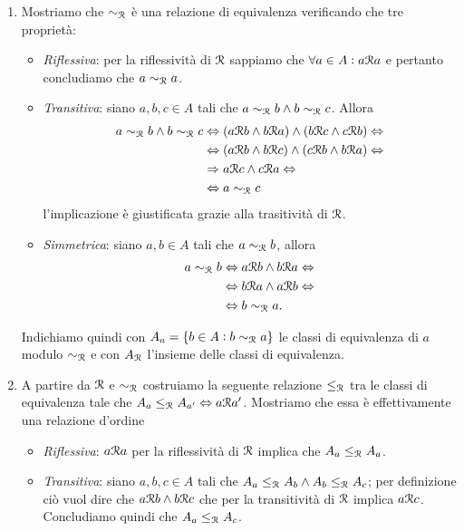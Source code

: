 \documentclass[a4paper]{article}\par \usepackage{style}\par
\begin{document}
\begin{enumerate}
\item Mostriamo che $ \sim_{\mathcal{R}} $ è una relazione di equivalenza verificando che tre proprietà:
  \begin{itemize}
  \item \emph{Riflessiva}: per la riflessività di $ \mathcal{R} $ sappiamo che $ \forall a \in A : a \mathcal{R} a $ e pertanto concludiamo che $ a \sim_{\mathcal{R}} a $.
  \item \emph{Transitiva}: siano $ a, b, c \in A $ tali che $ a \sim_{\mathcal{R}} b \wedge b \sim_{\mathcal{R}} c $. Allora
    \begin{align*}
      a \sim_{\mathcal{R}} b \wedge b \sim_{\mathcal{R}} c & \Leftrightarrow (a \mathcal{R} b \wedge b \mathcal{R} a) \wedge (b \mathcal{R} c \wedge c \mathcal{R} b) \Leftrightarrow \\
                                             & \Leftrightarrow (a \mathcal{R} b \wedge b \mathcal{R} c) \wedge (c \mathcal{R} b \wedge b \mathcal{R} a) \Leftrightarrow \\
                                             & \Rightarrow a \mathcal{R} c \wedge c \mathcal{R} a \Leftrightarrow \\
                                             & \Leftrightarrow a \sim_{\mathcal{R}} c
    \end{align*}
    l'implicazione è giustificata grazie alla trasitività di $ \mathcal{R} $.
  \item \emph{Simmetrica}: siano $ a, b \in A $ tali che $ a \sim_{\mathcal{R}} b $, allora
    \begin{align*}
      a \sim_{\mathcal{R}} b & \Leftrightarrow a \mathcal{R} b \wedge b \mathcal{R} a \Leftrightarrow \\
                      & \Leftrightarrow b \mathcal{R} a \wedge a \mathcal{R} b \Leftrightarrow \\
                      & \Leftrightarrow b \sim_{\mathcal{R}} a.
    \end{align*}
  \end{itemize}
  Indichiamo quindi con $ A_a = \{b \in A : b \sim_{\mathcal{R}} a\} $ le classi di equivalenza di $ a $ modulo $ \sim_{\mathcal{R}} $ e con $ A_{\mathcal{R}} $ l'insieme delle classi di equivalenza.
\item A partire da $ \mathcal{R} $ e $ \sim_{\mathcal{R}} $ costruiamo la seguente relazione $ \leq_{\mathcal{R}} $ tra le classi di equivalenza tale che $ A_a \leq_{\mathcal{R}} A_{a'} \Leftrightarrow a \mathcal{R} a' $. Mostriamo che essa è effettivamente una relazione d'ordine
  \begin{itemize}
  \item \emph{Riflessiva}: $ a \mathcal{R} a $ per la riflessività di $ \mathcal{R} $ implica che $ A_a \leq_{\mathcal{R}} A_a $.
  \item \emph{Transitiva}: siano $ a, b, c \in A $ tali che $ A_a \leq_{\mathcal{R}} A_b \wedge A_b \leq_{\mathcal{R}} A_c $; per definizione ciò vuol dire che $ a \mathcal{R} b \wedge b \mathcal{R} c $ che per la transitività di $ \mathcal{R} $ implica $ a \mathcal{R} c $. Concludiamo quindi che $ A_a \leq_{\mathcal{R}} A_c $.

\end{itemize}
\end{enumerate}
\end{document}
